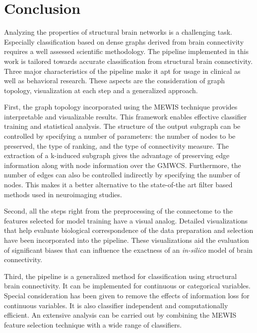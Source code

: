 \documentclass[msthesis.tex]{subfiles}
\begin{document}
\chapter{Conclusion}
\iffalse
Interpretability-accuracy tradeoff. 
With the solver - 42 features (10 nodes)
with the baseline - much more number of nodes for the same features.
\fi
Analyzing the properties of structural brain networks is a challenging task. Especially classification based on dense graphs derived from brain connectivity requires a well assessed scientific methodology. The pipeline implemented in this work is tailored towards accurate classification from structural brain connectivity. Three major characteristics of the pipeline make it apt for usage in clinical as well as behavioral research. These aspects are the consideration of graph topology, visualization at each step and a generalized approach. 

First, the graph topology incorporated using the \gls{MEWIS} technique provides interpretable and visualizable results. This framework enables effective classifier training and statistical analysis. The structure of the output subgraph can be controlled by specifying a number of parameters: the number of nodes to be preserved, the type of ranking, and the type of connectivity measure. The extraction of a k-induced subgraph gives the advantage of preserving edge information along with node information over the \gls{GMWCS}. Furthermore, the number of edges can also be controlled indirectly by specifying the number of nodes. This makes it a better alternative to the state-of-the art filter based methods used in neuroimaging studies. 

Second, all the steps right from the preprocessing of the connectome to the features selected for model training have a visual analog. Detailed visualizations that help evaluate biological correspondence of the data preparation and selection have been incorporated into the pipeline. These visualizations aid the evaluation of significant biases that can influence the exactness of an \textit{in-silico} model of brain connectivity. 

Third, the pipeline is a generalized method for classification using structural brain connectivity. It can be implemented for continuous or categorical variables. Special consideration has been given to remove the effects of information loss for continuous variables. It is also classifier independent and computationally efficient. An extensive analysis can be carried out by combining the \gls{MEWIS} feature selection technique with a wide range of classifiers.
\iffalse
Linear coefficient was used to account for the linear relationship between a particular feature and the continuous variable. For a binary variable group based differences were evaluated by grouping subjects. In this way information supervised filter methods were combined with graph topology considerations.
\fi
\end{document}

